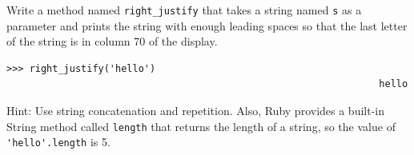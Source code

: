\documentclass[10pt]{book}
\begin{document}
\begin{exercise}

Write a method named \verb"right_justify" that takes a string
named {\tt s} as a parameter and prints the string with enough
leading spaces so that the last letter of the string is in column 70
of the display.

\begin{verbatim}
>>> right_justify('hello')
                                                                 hello
\end{verbatim}

Hint: Use string concatenation and repetition.  Also,
Ruby provides a built-in String method called {\tt length} that
returns the length of a string, so the value of \verb"'hello'.length" is 5.

\end{exercise}
\end{document}
